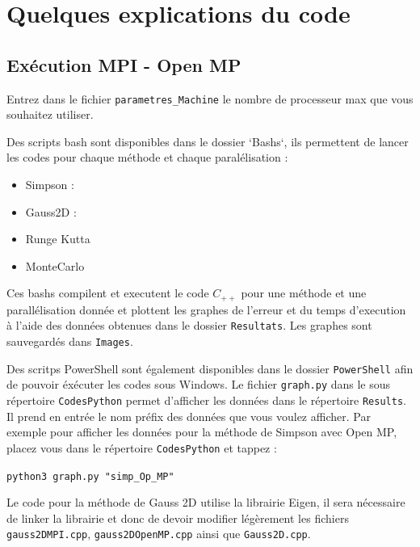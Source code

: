 \documentclass[10pt,a4paper]{article}
\begin{document}
\newpage
\section{Quelques explications du code}


\subsection{Exécution MPI - Open MP}

Entrez dans le fichier \verb|parametres_Machine| le nombre de processeur max que vous souhaitez utiliser.

Des scripts bash sont disponibles dans le dossier `Bashs`, ils permettent de lancer les codes pour chaque méthode et chaque paralélisation : 
\begin{itemize}
  \item Simpson : 
  \item Gauss2D :
  \item Runge Kutta 
  \item MonteCarlo 
\end{itemize}

Ces bashs compilent et executent le code $C_{++}$ pour une méthode et une parallélisation donnée et plottent les graphes de l'erreur et du temps d'execution à l'aide des données obtenues dans le dossier \verb|Resultats|. Les graphes sont sauvegardés dans \verb|Images|.


Des scritps PowerShell sont également disponibles dans le dossier \verb|PowerShell| afin de pouvoir éxécuter les codes sous Windows.
\newline
Le fichier \verb|graph.py| dans le sous répertoire \verb|CodesPython| permet d'afficher les données dans le répertoire \verb|Results|. 
Il prend en entrée le nom préfix des données que vous voulez afficher.
Par exemple pour afficher les données pour la méthode de Simpson avec Open MP, placez vous dans le répertoire \verb|CodesPython| et tappez : 
\begin{center}
\verb|python3 graph.py "simp_Op_MP"|
\end{center}
Le code pour la méthode de Gauss 2D utilise la librairie Eigen, il sera nécessaire de linker la librairie et donc de devoir modifier légèrement les fichiers \verb|gauss2DMPI.cpp|, \verb|gauss2DOpenMP.cpp| ainsi que \verb|Gauss2D.cpp|.
\end{document}
